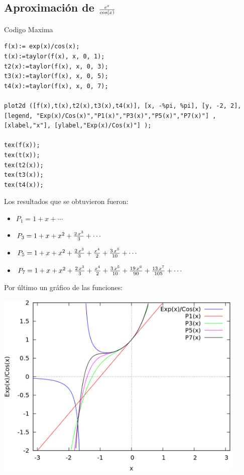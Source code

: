 \documentclass[12pt]{article}
\begin{document}
\subsection{Aproximación de $ e^x \over cos(x)$}
Codigo Maxima
\begin{verbatim}
f(x):= exp(x)/cos(x);
t(x):=taylor(f(x), x, 0, 1);
t2(x):=taylor(f(x), x, 0, 3);
t3(x):=taylor(f(x), x, 0, 5);
t4(x):=taylor(f(x), x, 0, 7);

plot2d ([f(x),t(x),t2(x),t3(x),t4(x)], [x, -%pi, %pi], [y, -2, 2],
[legend, "Exp(x)/Cos(x)","P1(x)","P3(x)","P5(x)","P7(x)"] ,
[xlabel,"x"], [ylabel,"Exp(x)/Cos(x)"] );

tex(f(x));
tex(t(x));
tex(t2(x));
tex(t3(x));
tex(t4(x));
\end{verbatim}
Los resultados que se obtuvieron fueron:
\begin{itemize}
\item{$P_1= 1+x+\cdots $}
\item{$P_3= 1+x+x^2+{{2\,x^3}\over{3}}+\cdots  $}
\item{$P_5= 1+x+x^2+{{2\,x^3}\over{3}}+{{x^4}\over{2}}+{{3\,x^5}\over{10}}+\cdots $}
\item{$P_7= 1+x+x^2+{{2\,x^3}\over{3}}+{{x^4}\over{2}}+{{3\,x^5}\over{10}}+{{19\,x^6}\over{90}}+{{13\,x^7}\over{105}}+\cdots $}
\end{itemize}
Por último un gráfico de las funciones:
\begin{center}
\includegraphics[width=12cm]{TaylorExp(x)Cos(x)}
\end{center}
\pagebreak
\end{document}
